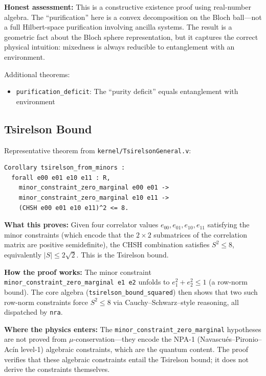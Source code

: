 \textbf{Honest assessment:} This is a constructive existence proof using real-number algebra. The ``purification'' here is a convex decomposition on the Bloch ball---not a full Hilbert-space purification involving ancilla systems. The result is a geometric fact about the Bloch sphere representation, but it captures the correct physical intuition: mixedness is always reducible to entanglement with an environment.

Additional theorems:
\begin{itemize}
    \item \texttt{purification\_deficit}: The ``purity deficit'' equals entanglement with environment
\end{itemize}

\subsection{Tsirelson Bound}

Representative theorem from \texttt{kernel/TsirelsonGeneral.v}:

\begin{lstlisting}
Corollary tsirelson_from_minors :
  forall e00 e01 e10 e11 : R,
    minor_constraint_zero_marginal e00 e01 ->
    minor_constraint_zero_marginal e10 e11 ->
    (CHSH e00 e01 e10 e11)^2 <= 8.
\end{lstlisting}

\textbf{What this proves:} Given four correlator values $e_{00}, e_{01}, e_{10}, e_{11}$ satisfying the minor constraints (which encode that the $2{\times}2$ submatrices of the correlation matrix are positive semidefinite), the CHSH combination satisfies $S^2 \leq 8$, equivalently $|S| \leq 2\sqrt{2}$. This is the Tsirelson bound.

\textbf{How the proof works:} The minor constraint \texttt{minor\_constraint\_zero\_marginal e1 e2} unfolds to $e_1^2 + e_2^2 \leq 1$ (a row-norm bound). The core algebra (\texttt{tsirelson\_bound\_squared}) then shows that two such row-norm constraints force $S^2 \leq 8$ via Cauchy--Schwarz--style reasoning, all dispatched by \texttt{nra}.

\textbf{Where the physics enters:} The \texttt{minor\_constraint\_zero\_marginal} hypotheses are not proved from $\mu$-conservation---they encode the NPA-1 (Navascu\'{e}s--Pironio--Ac\'{i}n level-1) algebraic constraints, which are the quantum content. The proof verifies that these algebraic constraints entail the Tsirelson bound; it does not derive the constraints themselves.

